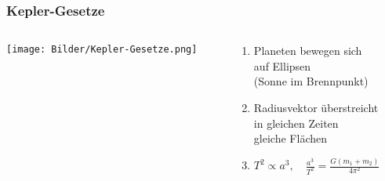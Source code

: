 \documentclass{beamer}
\begin{document}
\begin{frame}\frametitle{Kepler-Gesetze}

\begin{columns}

\begin{column}{.48\textwidth}

\texttt{[image: Bilder/Kepler-Gesetze.png]}

\end{column}

\hfill

\begin{column}{.48\textwidth}

\begin{enumerate}
\item Planeten bewegen sich\\ auf Ellipsen\\ (Sonne im Brennpunkt)\\[0.25cm]
\item Radiusvektor überstreicht\\ in gleichen Zeiten\\ gleiche Flächen\\[0.25cm]
\item $T^2 \propto a^3, \quad \frac{a^3}{T^2} = \frac{G(m_1+m_2)}{4\pi^2}$
\end{enumerate}

\end{column}

\end{columns}

\end{frame}
\end{document}
